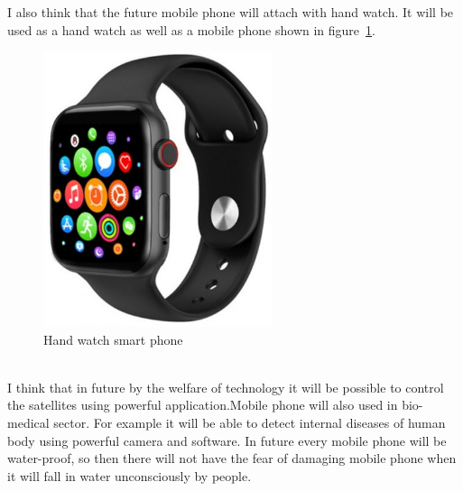 I also think that the future mobile phone will attach with hand watch. It will be used as a hand watch as well as a mobile phone shown in figure~\ref{fig:fig11}.\\
\begin{figure}[h]
    \centering
    \includegraphics[width = 0.6\textwidth]{pic/handwatch.jpg}
    \caption{Hand watch smart phone}
    \label{fig:fig11}
\end{figure}\\
I think that in future by the welfare of technology it will be possible to control the satellites using powerful application.Mobile phone will also used in bio-medical sector. For example it will be able to detect internal diseases of human body using powerful camera and software. In future every mobile phone will be water-proof, so then there will not have the fear of damaging mobile phone when it will fall in water unconsciously by people.\\



